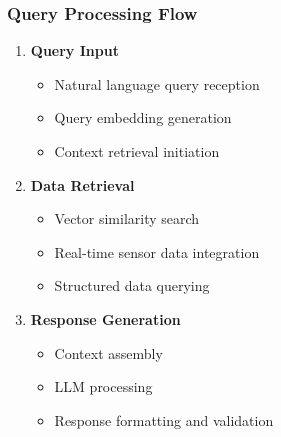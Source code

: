 \subsubsection{Query Processing Flow}
\begin{enumerate}
    \item \textbf{Query Input}
    \begin{itemize}
        \item Natural language query reception
        \item Query embedding generation
        \item Context retrieval initiation
    \end{itemize}

    \item \textbf{Data Retrieval}
    \begin{itemize}
        \item Vector similarity search
        \item Real-time sensor data integration
        \item Structured data querying
    \end{itemize}

    \item \textbf{Response Generation}
    \begin{itemize}
        \item Context assembly
        \item LLM processing
        \item Response formatting and validation
    \end{itemize}
\end{enumerate}